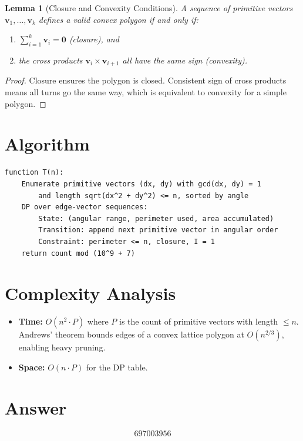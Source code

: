 \documentclass[11pt]{article}
\newtheorem{lemma}[theorem]{Lemma}
\begin{document}
\begin{lemma}[Closure and Convexity Conditions]
A sequence of primitive vectors $\mathbf{v}_1, \ldots, \mathbf{v}_k$ defines a valid convex polygon if and only if:
\begin{enumerate}
\item $\sum_{i=1}^{k} \mathbf{v}_i = \mathbf{0}$ (closure), and
\item the cross products $\mathbf{v}_i \times \mathbf{v}_{i+1}$ all have the same sign (convexity).
\end{enumerate}
\end{lemma}

\begin{proof}
Closure ensures the polygon is closed. Consistent sign of cross products means all turns go the same way, which is equivalent to convexity for a simple polygon.
\end{proof}

\section{Algorithm}

\begin{verbatim}
function T(n):
    Enumerate primitive vectors (dx, dy) with gcd(dx, dy) = 1
        and length sqrt(dx^2 + dy^2) <= n, sorted by angle
    DP over edge-vector sequences:
        State: (angular range, perimeter used, area accumulated)
        Transition: append next primitive vector in angular order
        Constraint: perimeter <= n, closure, I = 1
    return count mod (10^9 + 7)
\end{verbatim}

\section{Complexity Analysis}

\begin{itemize}
\item \textbf{Time:} $O(n^2 \cdot P)$ where $P$ is the count of primitive vectors with length $\le n$. Andrews' theorem bounds edges of a convex lattice polygon at $O(n^{2/3})$, enabling heavy pruning.
\item \textbf{Space:} $O(n \cdot P)$ for the DP table.
\end{itemize}

\section{Answer}

\[
\boxed{697003956}
\]
\end{document}
